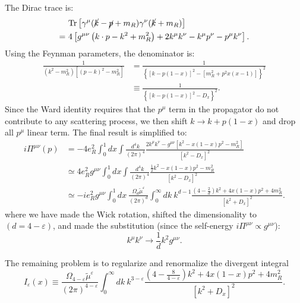 \documentclass[aps,prb,superscriptaddress,nofootinbib]{revtex4}
\begin{document}
The Dirac trace is:
\begin{equation}
\begin{aligned}
	&\ \mathrm{Tr}\left[\gamma^\mu (\cancel k- \cancel p +m_R) \gamma^\nu (\cancel k +m_R) \right] \\
	=&\ 4 \left[g^{\mu\nu} \left(k\cdot p-{k}^2+m_R^2\right)+ 2k^\mu k^\nu - k^\mu p^\nu - p^\mu k^\nu \right].
\end{aligned}
\end{equation}
Using the Feynman parameters, the denominator is:
\begin{equation}
\begin{aligned}
	\frac{1}{(k^2-m_R^2)[(p-k)^2-m_R^2]}
	&= \frac{1}{\left\{[k-p(1-x)]^2-[m_R^2+p^2 x(x-1)]\right\}^2} \\
	&\equiv \frac{1}{\left\{[k-p(1-x)]^2 - D_x \right\}^2}.
\end{aligned}
\end{equation}
Since the Ward identity requires that the $p^\mu$ term in the propagator do not contribute to any scattering process, we then shift $k \rightarrow k + p(1-x)$ and drop all $p^\mu$ linear term. 
The final result is simplified to:
\begin{equation}
\begin{aligned}
	i\Pi^{\mu \nu}(p) 
	&= -4 e_R^{2} \int_0^1 dx
		\int \frac{d^{4} k}{(2 \pi)^{4}}  \frac{2 k^{\mu} k^{\nu}-g^{\mu \nu}\left[k^{2}-x(1-x) p^{2}-m_R^{2}\right]}{\left[k^{2}-D_x \right]^{2}} \\
	&\simeq 4e_R^2 g^{\mu\nu} \int_0^1 dx \int\frac{d^4 k}{(2 \pi)^{4}}  
		\frac{\frac{1}{2}k^{2}-x(1-x) p^{2}-m_R^{2}}{\left[k^{2}-D_x \right]^{2}} \\
	&\simeq -ie_R^2 g^{\mu\nu} \int_0^1 dx\ \frac{\Omega_d \tilde{\mu}^\varepsilon}{(2\pi)^d} \int_0^\infty dk\ k^{d-1} \frac{\left(4-\frac{2}{d} \right) k^{2}+4x(1-x) p^{2}+4m_R^{2}}{\left[k^{2}+D_x\right]^{2}}.
\end{aligned}
\end{equation}
where we have made the Wick rotation, shifted the dimensionality to $(d=4-\varepsilon)$, and made the substitution (since the self-energy $i\Pi^{\mu\nu} \propto g^{\mu\nu}$):
\begin{equation}
	k^\mu k^\nu \rightarrow \frac{1}{d} k^2 g^{\mu\nu}.
\end{equation}

The remaining problem is to regularize and renormalize the divergent integral
\begin{equation}
	I_\varepsilon(x) \equiv \frac{\Omega_{4-\varepsilon} \tilde{\mu}^\varepsilon}{(2\pi)^{4-\varepsilon}} \int_0^\infty dk\ k^{3-\varepsilon} \frac{\left(4-\frac{8}{4-\varepsilon} \right) k^{2}+4x(1-x) p^{2}+4m_R^{2}}{\left[k^{2}+D_x\right]^{2}}.
\end{equation}
\end{document}
